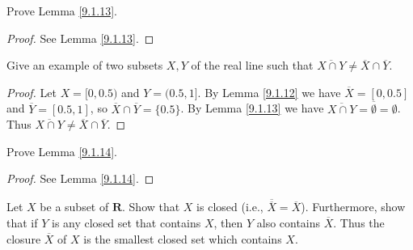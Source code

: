 \begin{exercise}\label{ex 9.1.3}
    Prove Lemma \ref{9.1.13}.
\end{exercise}

\begin{proof}
    See Lemma \ref{9.1.13}.
\end{proof}

\begin{exercise}\label{ex 9.1.4}
    Give an example of two subsets \(X, Y\) of the real line such that \(\overline{X \cap Y} \neq \overline{X} \cap \overline{Y}\).
\end{exercise}

\begin{proof}
    Let \(X = [0, 0.5)\) and \(Y = (0.5, 1]\).
    By Lemma \ref{9.1.12} we have \(\overline{X} = [0, 0.5]\) and \(\overline{Y} = [0.5, 1]\), so \(\overline{X} \cap \overline{Y} = \{0.5\}\).
    By Lemma \ref{9.1.13} we have \(\overline{X \cap Y} = \overline{\emptyset} = \emptyset\).
    Thus \(\overline{X \cap Y} \neq \overline{X} \cap \overline{Y}\).
\end{proof}

\begin{exercise}\label{ex 9.1.5}
    Prove Lemma \ref{9.1.14}.
\end{exercise}

\begin{proof}
    See Lemma \ref{9.1.14}.
\end{proof}

\begin{exercise}\label{ex 9.1.6}
    Let \(X\) be a subset of \(\mathbf{R}\).
    Show that \(X\) is closed (i.e., \(\overline{\overline{X}} = \overline{X}\)).
    Furthermore, show that if \(Y\) is any closed set that contains \(X\), then \(Y\) also contains \(\overline{X}\).
    Thus the closure \(\overline{X}\) of \(X\) is the smallest closed set which contains \(X\).
\end{exercise}

